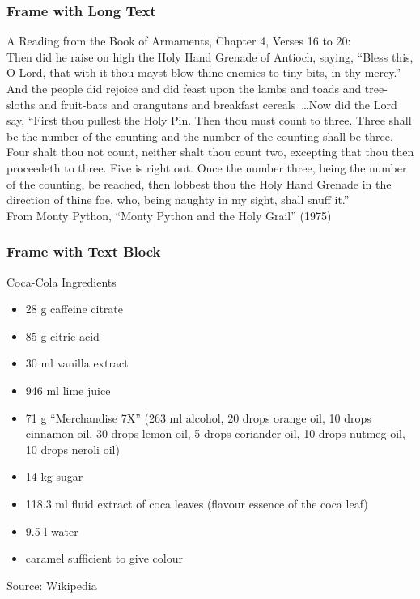 \expandafter\documentclass\expandafter[table, usenames, svgnames, dvipsnames, \classopts]{beamer}
\begin{document}
\begin{frame} 
	\frametitle{\textbf{Frame with Long Text}}
	
	{\small
		\justifying
		A Reading from the Book of Armaments, Chapter 4, Verses 16 to 20:
		\\[1em]
		Then did he raise on high the Holy Hand Grenade of Antioch, saying, ``Bless this, O Lord, that with it thou mayst blow thine enemies to tiny bits, in thy mercy.'' And the people did rejoice and did feast upon the lambs and toads and tree-sloths and fruit-bats and orangutans and breakfast cereals~\dots Now did the Lord say, ``First thou pullest the Holy Pin. Then thou must count to three. Three shall be the number of the counting and the number of the counting shall be three. Four shalt thou not count, neither shalt thou count two, excepting that thou then proceedeth to three. Five is right out. Once the number three, being the number of the counting, be reached, then lobbest thou the Holy Hand Grenade in the direction of thine foe, who, being naughty in my sight, shall snuff it.''
		\\[1em]
		{\scriptsize From Monty Python, ``Monty Python and the Holy Grail'' (1975)}
	}
	
\end{frame}

\begin{frame} 
	\frametitle{\textbf{Frame with Text Block}}
	
	\begin{block}{{\scriptsize Coca-Cola Ingredients}}
		{\tiny
			\begin{itemize}
				\item 28 g caffeine citrate
				\item 85 g citric acid
				\item 30 ml vanilla extract
				\item 946 ml lime juice
				\item 71 g ``Merchandise 7X'' (263 ml alcohol, 20 drops orange oil, 10 drops cinnamon oil, 30 drops lemon oil, 5 drops coriander oil, 10 drops nutmeg oil, 10 drops neroli oil)
				\item 14 kg sugar
				\item 118.3 ml fluid extract of coca leaves (flavour essence of the coca leaf)
				\item 9.5 l water
				\item caramel sufficient to give colour
			\end{itemize}
			Source: Wikipedia
		}
	\end{block}

\end{frame}
\end{document}
